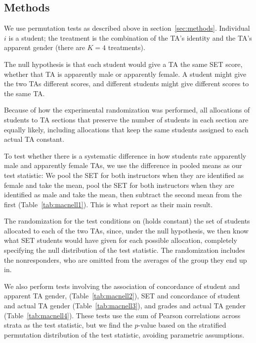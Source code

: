 \documentclass[12pt]{article}
\begin{document}
\subsection{Methods}\label{macnell:methods}
We use permutation tests as described above in section~\ref{sec:methods}.
Individual $i$ is a student; the treatment is the combination of the TA's identity and the TA's
apparent gender (there are $K=4$ treatments).

The null hypothesis is that each student would give a TA the same SET score,
whether that TA is apparently male or apparently female.
A student might give the two TAs different scores,
and different students might give different scores to the same TA. 

Because of how the experimental randomization was performed, all allocations of students to 
TA sections that preserve the number of students in each section are equally likely,  
including allocations that keep the same students assigned to each actual TA constant.

To test whether there is a systematic difference in how students rate apparently male and 
apparently female TAs, we use the difference in pooled means as our test statistic:
We pool the SET for both instructors when they are identified as female
and take the mean, pool the SET for both instructors when they are identified as male
and take the mean, then subtract the second mean from the first (Table~\ref{tab:macnell1}).
This is what \cite{MacNell2014} report as their main result.

The randomization for the test conditions on (holds constant) the set of students 
allocated to each of the two TAs, since, under the null hypothesis, we then know what 
SET students would have given for each possible allocation, completely specifying the
null distribution of the test statistic.
The randomization includes the nonresponders, who are omitted from the averages of the
group they end up in.

We also perform tests involving the association of concordance of student and apparent TA
gender,
(Table~\ref{tab:macnell2}), SET and concordance of student and actual TA gender 
(Table~\ref{tab:macnell3}), and grades and actual TA gender (Table~\ref{tab:macnell4}).  
These tests use the sum of Pearson correlations across strata as the test statistic, 
but we find the $p$-value
based on the stratified permutation distribution of the test statistic, avoiding
parametric assumptions.
\end{document}
